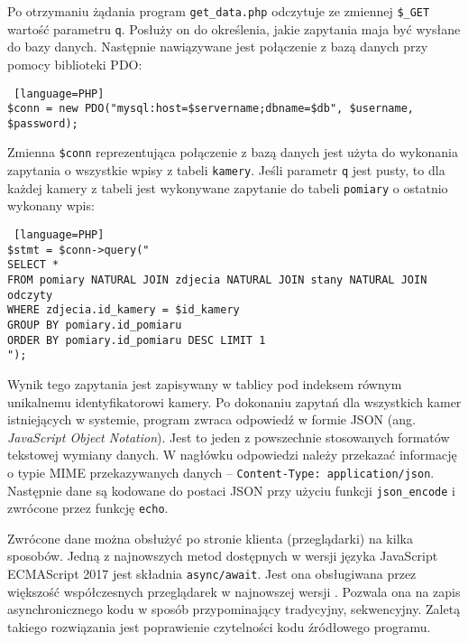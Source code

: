 \documentclass[a4paper,11pt,twoside]{article}
\begin{document}
Po otrzymaniu żądania program \texttt{get{\_}data.php} odczytuje ze zmiennej \texttt{{\$\_}GET} wartość parametru \texttt{q}. Posłuży on do określenia, jakie zapytania maja być wysłane do bazy danych. Następnie nawiązywane jest połączenie z bazą danych przy pomocy biblioteki PDO:
\begin{lstlisting} [language=PHP]
$conn = new PDO("mysql:host=$servername;dbname=$db", $username, $password);
\end{lstlisting}
Zmienna \texttt{\$conn} reprezentująca połączenie z bazą danych jest użyta do wykonania zapytania o wszystkie wpisy z tabeli \texttt{kamery}. Jeśli parametr \texttt{q} jest pusty, to dla każdej kamery z tabeli jest wykonywane zapytanie do tabeli \texttt{pomiary} o ostatnio wykonany wpis:
\begin{lstlisting} [language=PHP]
$stmt = $conn->query("
SELECT *
FROM pomiary NATURAL JOIN zdjecia NATURAL JOIN stany NATURAL JOIN odczyty
WHERE zdjecia.id_kamery = $id_kamery 
GROUP BY pomiary.id_pomiaru 
ORDER BY pomiary.id_pomiaru DESC LIMIT 1
");
\end{lstlisting}
Wynik tego zapytania jest zapisywany w tablicy pod indeksem równym unikalnemu identyfikatorowi kamery. Po dokonaniu zapytań dla wszystkich kamer istniejących w systemie, program zwraca odpowiedź w formie JSON (ang. \textit{JavaScript Object Notation}). Jest to jeden z powszechnie stosowanych formatów tekstowej wymiany danych. W nagłówku odpowiedzi należy przekazać informację o typie MIME przekazywanych danych\cite{mime2} -- \texttt{Content-Type: \linebreak application/json}. Następnie dane są kodowane do postaci JSON przy użyciu funkcji \linebreak\texttt{json{\_}encode} i zwrócone przez funkcję \texttt{echo}.

Zwrócone dane można obsłużyć po stronie klienta (przeglądarki) na kilka sposobów. Jedną z najnowszych metod dostępnych w wersji języka JavaScript ECMAScript 2017 jest składnia \texttt{async/await}. Jest ona obsługiwana przez większość współczesnych przeglądarek w najnowszej wersji \cite{async}. Pozwala ona na zapis asynchronicznego kodu w sposób przypominający tradycyjny, sekwencyjny. Zaletą takiego rozwiązania jest poprawienie czytelności kodu źródłowego programu. 
\end{document}
